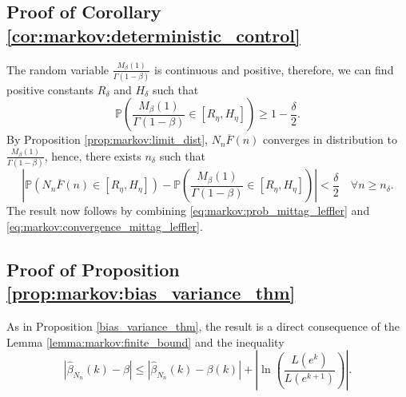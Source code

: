 \documentclass[sn-mathphys-ay]{sn-jnl}%
\renewcommand{\P}{\mathbb{P}}
\begin{document}
\begin{appendices}
\subsection{Proof of Corollary \ref{cor:markov:deterministic_control}}
The random variable \(\frac{M_{\beta}(1)}{\Gamma(1-\beta)} \) is continuous and positive, therefore,
we can find positive constants \(R_\delta\) and \(H_\delta\) such that
\begin{equation}\label{eq:markov:prob_mittag_leffler}
    \P\left( {\frac{M_{\beta}(1)}{\Gamma(1-\beta)} \in \left[ {R_\eta ,H_\eta} \right]} \right) \geqslant 1 - \frac{\delta }{2}.
\end{equation}
By Proposition \ref{prop:markov:limit_dist}, \(N_n\overline{F}(n)\) converges in distribution
to \(\frac{M_{\beta}(1)}{\Gamma(1-\beta)}\), hence, there exists \(n_\delta\) such that
\begin{equation}\label{eq:markov:convergence_mittag_leffler}
    \left|\P \left( N_n\overline{F}(n) \in \left[ {R_\eta ,H_\eta} \right]\right) - \P \left( {\frac{M_{\beta}(1)}{\Gamma(1-\beta)} \in \left[ {R_\eta ,H_\eta} \right]} \right)\right|<\frac{\delta}{2}\quad\forall n\geq n_\delta.
\end{equation}
The result now follows by combining \eqref{eq:markov:prob_mittag_leffler} and \eqref{eq:markov:convergence_mittag_leffler}.
\subsection{Proof of Proposition \ref{prop:markov:bias_variance_thm}}

As in Proposition \ref{bias_variance_thm}, the result is a direct consequence of
the Lemma \ref{lemma:markov:finite_bound} and the inequality
\begin{equation*}
    \left|\widehat{\beta}_{N_n}(k)-\beta\right| \leq
    \left|\widehat{\beta}_{N_n}(k)-\beta(k)\right| + \left| \ln\left(\frac{L(e^{k})}{L(e^{k+1})}\right) \right|.
\end{equation*}


\end{appendices}
\end{document}
